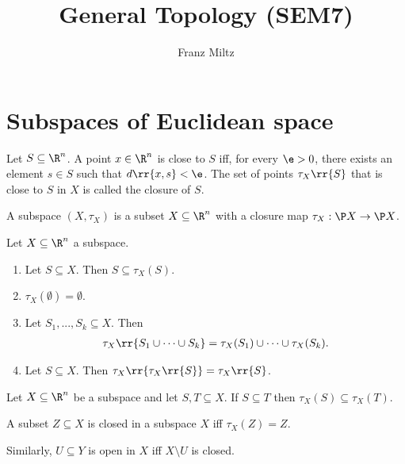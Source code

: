 \documentclass{article}
\begin{document}
\mkthmstwounified
\title{General Topology (SEM7)}
\author{Franz Miltz}
\maketitle
\tableofcontents
\pagebreak


\section{Subspaces of Euclidean space}
\label{sec:euclidean-subspaces}

\begin{definition}
	Let $S\subseteq \R^n$. A point $x\in\R^n$ is close to $S$ iff, for every $\e>0$, there
	exists an element $s\in S$ such that $d \rr{ x,s }<\e$. The set of points $\tau_X \rr{ S }$
	that is close to $S$ in $X$ is called the closure of $S$.

	A subspace $(X, \tau_X)$ is a subset $X\subseteq\R^n$ with a closure map
	$\tau_X:\P X \to \P X$.
\end{definition}

\begin{theorem}
	\label{prop:properties-of-closure}
	Let $X\subseteq\R^n$ a subspace.
	\begin{enumerate}
		\item Let $S\subseteq X$. Then $S\subseteq \tau_X(S)$.
		\item $\tau_X(\emptyset)=\emptyset$.
		\item Let $S_1,...,S_k\subseteq X$. Then  \begin{align*}
			      \tau_X \rr{ S_1 \cup \cdots \cup S_k } = \tau_X (S_1) \cup \cdots \cup \tau_X (S_k).
		      \end{align*}
		\item Let $S\subseteq X$. Then $\tau_X \rr{ \tau_X \rr{ S } } = \tau_X \rr{ S }$.
	\end{enumerate}
\end{theorem}

\begin{corollary}
	Let $X\subseteq\R^n$ be a subspace and let $S,T\subseteq X$. If $S\subseteq T$ then
	$\tau_X(S)\subseteq \tau_X(T)$.
\end{corollary}

\begin{definition}
	\label{def:closed}
	A subset $Z\subseteq X$ is closed in a subspace $X$ iff $\tau_X(Z)=Z$.

	Similarly, $U\subseteq Y$ is open in $X$ iff $X\setminus U$ is closed.
\end{definition}
\end{document}

